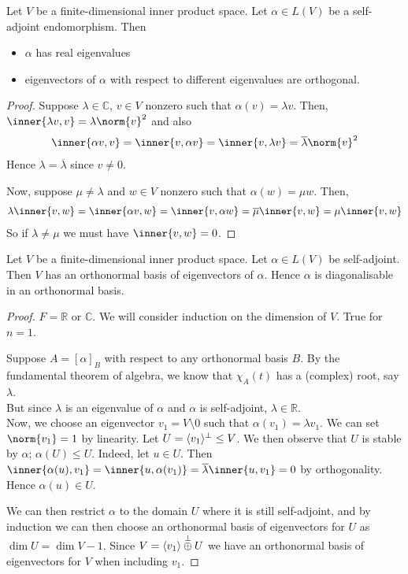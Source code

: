 \begin{lemma}
	Let $V$ be a finite-dimensional inner product space.
	Let $\alpha \in L(V)$ be a self-adjoint endomorphism.
	Then 
	\begin{itemize}
		\item $\alpha$ has real eigenvalues
		\item eigenvectors of $\alpha$ with respect to different eigenvalues are orthogonal.
	\end{itemize}
\end{lemma}

\begin{proof}
	Suppose $\lambda \in \mathbb C$, $v \in V$ nonzero such that $\alpha(v) = \lambda v$.
	Then, $\inner{\lambda v, v} = \lambda \norm{v}^2$ and also
	\begin{align*}
		\inner{\alpha v, v} = \inner{v, \alpha v} = \inner{v, \lambda v} = \overline{\lambda} \norm{v}^2
	\end{align*}
	Hence $\lambda = \overline{\lambda}$ since $v \neq 0$.

	Now, suppose $\mu \neq \lambda$ and $w \in V$ nonzero such that $\alpha(w) = \mu w$.
	Then,
	\begin{align*}
		\lambda \inner{v, w} = \inner{\alpha v, w} = \inner{v, \alpha w} = \overline{\mu} \inner{v, w} = \mu \inner{v,w}
	\end{align*}
	So if $\lambda \neq \mu$ we must have $\inner{v,w} = 0$.
\end{proof}

\begin{theorem}
	Let $V$ be a finite-dimensional inner product space.
	Let $\alpha \in L(V)$ be self-adjoint.
	Then $V$ has an orthonormal basis of eigenvectors of $\alpha$.
	Hence $\alpha$ is diagonalisable in an orthonormal basis.
\end{theorem}

\begin{proof}
	$F = \mathbb{R}$ or $\mathbb{C}$.
	We will consider induction on the dimension of $V$.
	True for $n = 1$.

	Suppose $A = [\alpha]_B$ with respect to any orthonormal basis $B$.
	By the fundamental theorem of algebra, we know that $\chi_A(t)$ has a (complex) root, say $\lambda$. \\
	But since $\lambda$ is an eigenvalue of $\alpha$ and $\alpha$ is self-adjoint, $\lambda \in \mathbb R$. \\
	Now, we choose an eigenvector $v_1 = V \setminus \qty{0}$ such that $\alpha(v_1) = \lambda v_1$.
	We can set $\norm{v_1} = 1$ by linearity.
	Let $U = \langle{} v_1 \rangle^\perp \leq V$.
	We then observe that $U$ is stable by $\alpha$; $\alpha(U) \leq U$.
	Indeed, let $u \in U$.
	Then $\inner{\alpha(u), v_1} = \inner{u, \alpha(v_1)} = \overline \lambda \inner{u, v_1} = 0$ by orthogonality.
	Hence $\alpha(u) \in U$.

	We can then restrict $\alpha$ to the domain $U$ where it is still self-adjoint, and by induction we can then choose an orthonormal basis of eigenvectors for $U$ as $\dim U = \dim V - 1$.
	Since $V = \langle{} v_1 \rangle \overset{\perp}{\oplus} U$ we have an orthonormal basis of eigenvectors for $V$ when including $v_1$.
\end{proof}


